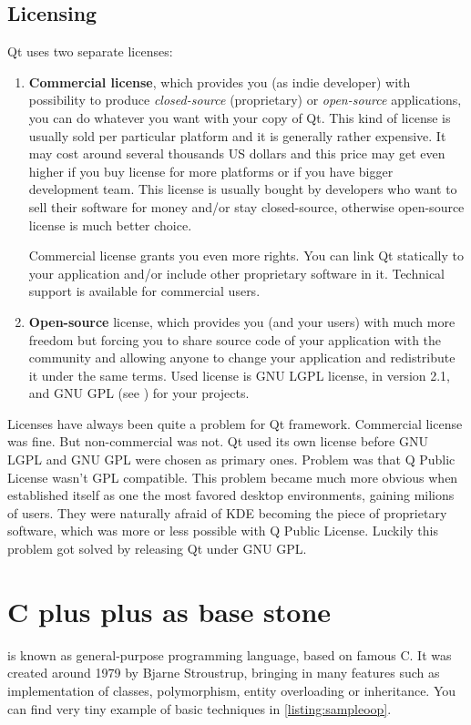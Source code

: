 \subsection{Licensing}
Qt uses two separate licenses:
\begin{enumerate}
\item \textbf{Commercial license}, which provides you (as indie developer) with possibility to produce \textit{closed-source} (proprietary) or \textit{open-source} applications, you can do whatever you want with your copy of Qt. This kind of license is usually sold per particular platform and it is generally rather expensive. It may cost around several thousands US dollars and this price may get even higher if you buy license for more platforms or if you have bigger development team. This license is usually bought by developers who want to sell their software for money and/or stay closed-source, otherwise open-source license is much better choice.

Commercial license grants you even more rights. You can link Qt statically to your application and/or include other proprietary software in it. Technical support is available for commercial users.

\item \textbf{Open-source} license, which provides you (and your users) with much more freedom but forcing you to share source code of your application with the community and allowing anyone to change your application and redistribute it under the same terms. Used license is GNU LGPL license, in version 2.1, and GNU GPL (see \citep{stallman:gnugpl}) for your projects.
\end{enumerate}

Licenses have always been quite a problem for Qt framework. Commercial license was fine. But non-commercial was not. Qt used its own license before GNU LGPL and GNU GPL were chosen as primary ones. Problem was that Q Public License wasn't GPL compatible. This problem became much more obvious when  established itself as one the most favored desktop environments, gaining milions of users. They were naturally afraid of KDE becoming the piece of proprietary software, which was more or less possible with Q Public License. Luckily this problem got solved by releasing Qt under GNU GPL.

\section{C plus plus as base stone}\label{subsection:cpp}
\cpp is known as general-purpose programming language, based on famous C. It was created around 1979 by Bjarne Stroustrup, bringing in many  features such as implementation of classes, polymorphism, entity overloading or inheritance. You can find very tiny example of basic techniques in \autoref{listing:sampleoop}.

